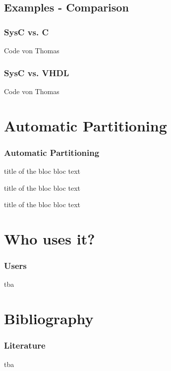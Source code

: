 \documentclass{beamer}
\begin{document}
\subsection{Examples - Comparison}
\begin{frame}\frametitle{SysC vs. C} 
Code von Thomas
\end{frame}
\begin{frame}\frametitle{SysC vs. VHDL} 
Code von Thomas
\end{frame}


\section{Automatic Partitioning}
\begin{frame}\frametitle{Automatic Partitioning} 

\begin{block}{title of the bloc}
bloc text
\end{block}

\begin{exampleblock}{title of the bloc}
bloc text
\end{exampleblock}


\begin{alertblock}{title of the bloc}
bloc text
\end{alertblock}
\end{frame}


\section{Who uses it?}
\begin{frame}\frametitle{Users} 
tba
\end{frame}
      
\section{Bibliography}
\begin{frame}\frametitle{Literature} 
tba
\end{frame}
\end{document}
